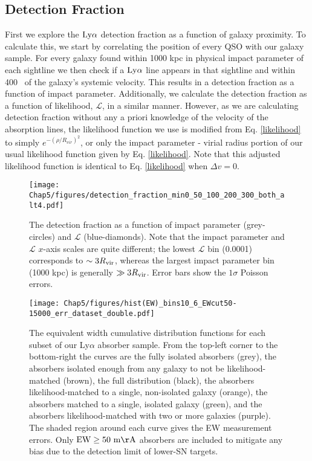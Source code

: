 \subsection{Detection Fraction}
First we explore the $\rm Ly\alpha$ detection fraction as a function of galaxy proximity. To calculate this, we start by correlating the position of every QSO with our galaxy sample. For every galaxy found within 1000 kpc in physical impact parameter of each sightline we then check if a $\rm Ly\alpha$ line appears in that sightline and within 400 \kms~of the galaxy's systemic velocity. This results in a detection fraction as a function of impact parameter. Additionally, we calculate the detection fraction as a function of likelihood, $\mathcal{L}$, in a similar manner. However, as we are calculating detection fraction without any a priori knowledge of the velocity of the absorption lines, the likelihood function we use is modified from Eq. \ref{likelihood} to simply $e^{-(\rho/R_{vir})^2}$, or only the impact parameter - virial radius portion of our usual likelihood function given by Eq. \ref{likelihood}. Note that this adjusted likelihood function is identical to Eq. \ref{likelihood} when $\Delta v = 0$. 

\begin{figure}[t!]
        \centering
        \vspace{0pt}
        \texttt{[image: Chap5/figures/detection\_fraction\_min0\_50\_100\_200\_300\_both\_alt4.pdf]}
        \caption{\small{The detection fraction as a function of impact parameter (grey-circles) and $\mathcal{L}$ (blue-diamonds). Note that the impact parameter and $\mathcal{L}$ $x$-axis scales are quite different; the lowest $\mathcal{L}$ bin (0.0001) corresponds to $\sim 3 R_{\rm vir}$, whereas the largest impact parameter bin (1000 kpc) is generally $\gg 3 R_{\rm vir}$. Error bars show the $1\sigma$ Poisson errors.}}
        \vspace{0pt}
        \label{detection_fraction}
\end{figure}



\begin{figure}[ht!]
        \centering
        \texttt{[image: Chap5/figures/hist(EW)\_bins10\_6\_EWcut50-15000\_err\_dataset\_double.pdf]}
        \caption{\small{The equivalent width cumulative distribution functions for each subset of our Ly$\alpha$ absorber sample. From the top-left corner to the bottom-right the curves are the fully isolated absorbers (grey), the absorbers isolated enough from any galaxy to not be likelihood-matched (brown), the full distribution (black), the absorbers likelihood-matched to a single, non-isolated galaxy (orange), the absorbers matched to a single, isolated galaxy (green), and the absorbers likelihood-matched with two or more galaxies (purple). The shaded region around each curve gives the EW measurement errors. Only $\rm EW \ge 50~m\AA$ absorbers are included to mitigate any bias due to the detection limit of lower-SN targets.}}
        \label{cdf_ew}
\end{figure}


